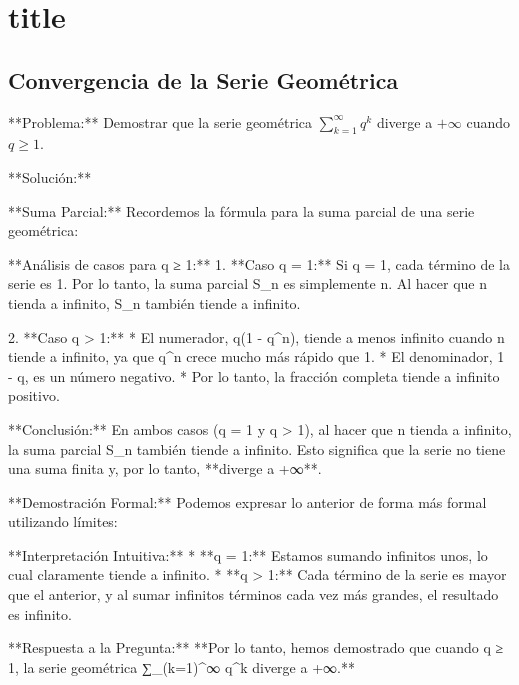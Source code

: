 \chapter*{title}
\section{Convergencia de la Serie Geométrica}

    **Problema:**
    Demostrar que la serie geométrica $\sum_{k=1}^{\infty} q^k$ diverge a $+\infty$ cuando $q \geq 1$.

    **Solución:**

    **Suma Parcial:**
    Recordemos la fórmula para la suma parcial de una serie geométrica:

    **Análisis de casos para q ≥ 1:**
    1.  **Caso q = 1:**
        Si q = 1, cada término de la serie es 1. Por lo tanto, la suma parcial S_n es simplemente n. Al hacer que n tienda a infinito, S_n también tiende a infinito.

    2.  **Caso q > 1:**
        *   El numerador, q(1 - q^n), tiende a menos infinito cuando n tiende a infinito, ya que q^n crece mucho más rápido que 1.
        *   El denominador, 1 - q, es un número negativo.
        *   Por lo tanto, la fracción completa tiende a infinito positivo.

    **Conclusión:**
    En ambos casos (q = 1 y q > 1), al hacer que n tienda a infinito, la suma parcial S_n también tiende a infinito. Esto significa que la serie no tiene una suma finita y, por lo tanto, **diverge a +∞**.

    **Demostración Formal:**
    Podemos expresar lo anterior de forma más formal utilizando límites:

    **Interpretación Intuitiva:**
    * **q = 1:** Estamos sumando infinitos unos, lo cual claramente tiende a infinito.
    * **q > 1:** Cada término de la serie es mayor que el anterior, y al sumar infinitos términos cada vez más grandes, el resultado es infinito.

    **Respuesta a la Pregunta:**
    **Por lo tanto, hemos demostrado que cuando q ≥ 1, la serie geométrica ∑_(k=1)^∞ q^k diverge a +∞.**

